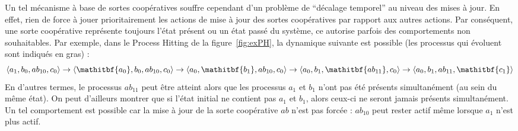 Un tel mécanisme à base de sortes coopératives souffre cependant d'un problème de “décalage temporel” au niveau des mises à jour.
En effet, rien de force à jouer prioritairement les actions de mise à jour des sortes coopératives par rapport aux autres actions.
Par conséquent, une sorte coopérative représente toujours l'état présent ou un état passé du système, ce autorise parfois des comportements non souhaitables.
Par exemple, dans le Process Hitting de la figure~\ref{fig:exPH}, la dynamique suivante est possible (les processus qui évoluent sont indiqués en gras) :
$$
  \PHetat{a_1, b_0, ab_{10}, c_0} \rightarrow
  \PHetat{\mathitbf{a_0}, b_0, ab_{10}, c_0} \rightarrow
  \PHetat{a_0, \mathitbf{b_1}, ab_{10}, c_0} \rightarrow
  \PHetat{a_0, b_1, \mathitbf{ab_{11}}, c_0} \rightarrow
  \PHetat{a_0, b_1, ab_{11}, \mathitbf{c_1}}
$$
En d'autres termes, le processus $ab_{11}$ peut être atteint alors que les processus $a_1$ et $b_1$ n'ont pas été présents simultanément (\ie au sein du même état).
On peut d'ailleurs montrer que si l'état initial ne contient pas $a_1$ et $b_1$, alors ceux-ci ne seront jamais présents simultanément.
Un tel comportement est possible car la mise à jour de la sorte coopérative $ab$ n'est pas forcée :
$ab_{10}$ peut rester actif même lorsque $a_1$ n'est plus actif.

